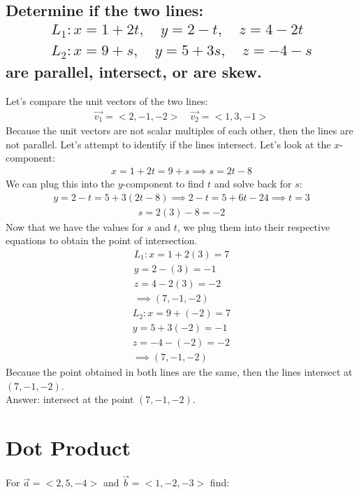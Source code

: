 \documentclass{article}
\begin{document}
\subsection{Determine if the two lines:
	\begin{align*}
		L_1: x = 1 + 2t, \quad y = 2 - t, \quad z = 4 - 2t \\
		L_2: x = 9 + s, \quad y = 5 + 3s, \quad z = -4 - s
	\end{align*}
	are parallel, intersect, or are skew.
}
Let’s compare the unit vectors of the two lines:
\begin{align*}
	\vec{v_1} = <2, -1, -2> \quad \vec{v_2} = <1, 3, -1>
\end{align*}
Because the unit vectors are not scalar multiples of each other, then the lines are not parallel. Let's attempt to identify if the lines intersect. Let's look at the $x$-component:
\begin{align*}
	x = 1 + 2t = 9 + s \implies s = 2t - 8
\end{align*}
We can plug this into the $y$-component to find $t$ and solve back for $s$:
\begin{align*}
	y = 2 - t = 5 + 3(2t - 8) \implies 2 - t = 5 + 6t -24 \implies t = 3
\end{align*}
\begin{align*}
	s = 2(3) - 8 = -2
\end{align*}
Now that we have the values for $s$ and $t$, we plug them into their respective equations to obtain the point of intersection.
\begin{align*}
	L_1: x = 1 + 2(3) = 7 \\
		y = 2 - (3) = -1 \\
		z = 4 - 2(3) = -2 \\
		\implies (7, -1, -2)
\end{align*}
\begin{align*}
	L_2: x = 9 + (-2) = 7 \\
		y = 5 + 3(-2) = -1 \\
		z = -4 - (-2) = -2 \\
		\implies (7, -1, -2)
\end{align*}
Because the point obtained in both lines are the same, then the lines intersect at $(7, -1, -2)$. \\[10pt]
Answer: intersect at the point $(7, -1, -2)$.

\section{Dot Product}
For $\vec{a} = <2, 5, -4>$ and $\vec{b} = <1, -2, -3>$ find:
\end{document}
